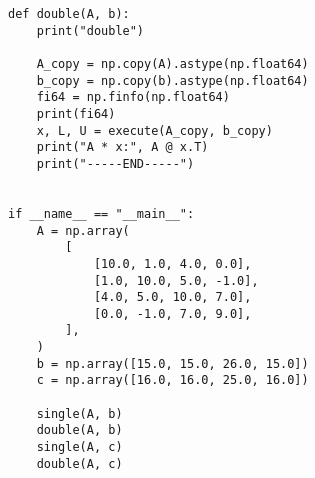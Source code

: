 \documentclass{jsarticle}
\begin{document}
\begin{lstlisting}[caption=gaussの消去法,label=参照ラベル]
def double(A, b):
    print("double")

    A_copy = np.copy(A).astype(np.float64)
    b_copy = np.copy(b).astype(np.float64)
    fi64 = np.finfo(np.float64)
    print(fi64)
    x, L, U = execute(A_copy, b_copy)
    print("A * x:", A @ x.T)
    print("-----END-----")


if __name__ == "__main__":
    A = np.array(
        [
            [10.0, 1.0, 4.0, 0.0],
            [1.0, 10.0, 5.0, -1.0],
            [4.0, 5.0, 10.0, 7.0],
            [0.0, -1.0, 7.0, 9.0],
        ],
    )
    b = np.array([15.0, 15.0, 26.0, 15.0])
    c = np.array([16.0, 16.0, 25.0, 16.0])

    single(A, b)
    double(A, b)
    single(A, c)
    double(A, c)

\end{lstlisting}
\begin{lstlisting}[caption=スクリプトファイル名,label=参照ラベル]
\end{lstlisting}


\end{document}
